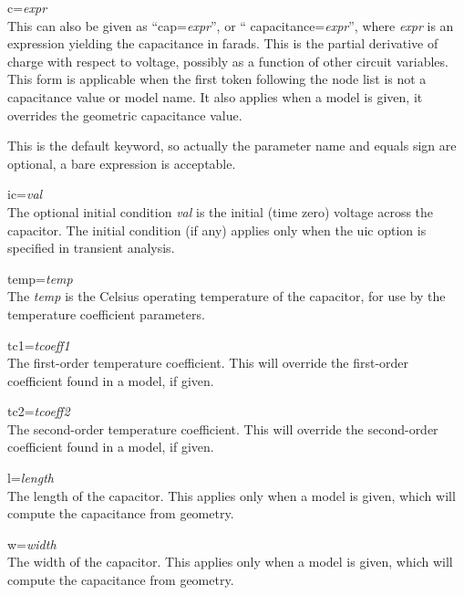 \begin{description}
\item{\vt c=}{\it expr}\\
This can also be given as ``{\vt cap=}{\it expr}'', or ``{\vt
capacitance=}{\it expr}'', where {\it expr} is an expression yielding
the capacitance in farads.  This is the partial derivative of charge
with respect to voltage, possibly as a function of other circuit
variables.  This form is applicable when the first token following the
node list is not a capacitance value or model name.  It also applies
when a model is given, it overrides the geometric capacitance value.

This is the default keyword, so actually the parameter name and equals
sign are optional, a bare expression is acceptable.

\item{\vt ic=}{\it val}\\
The optional initial condition {\it val} is the initial (time zero)
voltage across the capacitor.  The initial condition (if any) applies
only when the {\vt uic} option is specified in transient analysis.

\item{\vt temp=}{\it temp}\\
The {\it temp} is the Celsius operating temperature of the capacitor,
for use by the temperature coefficient parameters.

\item{\vt tc1=}{\it tcoeff1}\\
The first-order temperature coefficient.  This will override the
first-order coefficient found in a model, if given.

\item{\vt tc2=}{\it tcoeff2}\\
The second-order temperature coefficient.  This will override the
second-order coefficient found in a model, if given.

\item{\vt l=}{\it length}\\
The length of the capacitor.  This applies only when a model is given,
which will compute the capacitance from geometry.

\item{\vt w=}{\it width}\\
The width of the capacitor.  This applies only when a model is given,
which will compute the capacitance from geometry.
\end{description}

